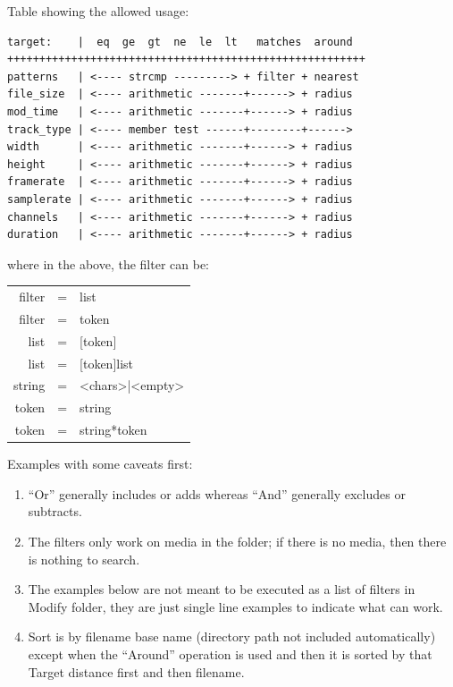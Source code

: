 Table showing the allowed usage:

\begin{lstlisting}
target:    |  eq  ge  gt  ne  le  lt   matches  around
++++++++++++++++++++++++++++++++++++++++++++++++++++++++
patterns   | <---- strcmp ---------> + filter + nearest
file_size  | <---- arithmetic -------+------> + radius
mod_time   | <---- arithmetic -------+------> + radius
track_type | <---- member test ------+--------+------>
width      | <---- arithmetic -------+------> + radius
height     | <---- arithmetic -------+------> + radius
framerate  | <---- arithmetic -------+------> + radius
samplerate | <---- arithmetic -------+------> + radius
channels   | <---- arithmetic -------+------> + radius
duration   | <---- arithmetic -------+------> + radius
\end{lstlisting}

where in the above, the filter can be:

\begin{tabular}{rcl}
    filter&=&list\\
    filter&=&token\\
    list&=&[token]\\
    list&=&[token]list\\
    string&=&<chars>|<empty>\\
    token&=&string\\
    token&=&string*token\\
\end{tabular}

Examples with some caveats first:

\begin{enumerate}
    \item   “Or” generally includes or adds whereas “And” generally excludes or subtracts.
    \item   The filters only work on media in the folder; if there is no media, then there is nothing to search.
    \item   The examples below are not meant to be executed as a list of filters in Modify folder, they are just single line examples to indicate what can work.
    \item   Sort is by filename base name (directory path not included automatically) except when the “Around” operation is used and then it is sorted by that Target distance first and then filename.
\end{enumerate}


